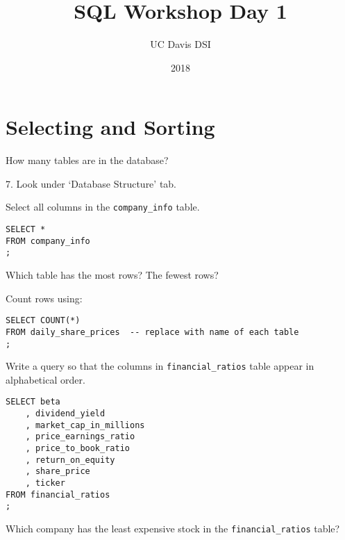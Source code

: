 \documentclass[10pt]{exam}
\begin{document}
 
\title{SQL Workshop Day 1}
\author{UC Davis DSI}
\date{2018}

\maketitle

\section{Selecting and Sorting}

\begin{questions}

\question How many tables are in the database?

\begin{solution}
    7. Look under `Database Structure' tab.
\end{solution}


\question Select all columns in the \texttt{company\_info} table.

\begin{solution}
\begin{lstlisting}
SELECT *
FROM company_info
;
\end{lstlisting}
\end{solution}


\question Which table has the most rows? The fewest rows?

\begin{solution}

    Count rows using:

\begin{lstlisting}
SELECT COUNT(*)
FROM daily_share_prices  -- replace with name of each table
;
\end{lstlisting}
\end{solution}


\question Write a query so that the columns in \texttt{financial\_ratios} table
appear in alphabetical order.

\begin{solution}
\begin{lstlisting}
SELECT beta
    , dividend_yield
    , market_cap_in_millions
    , price_earnings_ratio
    , price_to_book_ratio
    , return_on_equity
    , share_price
    , ticker
FROM financial_ratios
;
\end{lstlisting}
\end{solution}


    \question Which company has the least expensive stock in the
    \texttt{financial\_ratios} table?


\end{questions}
\end{document}
